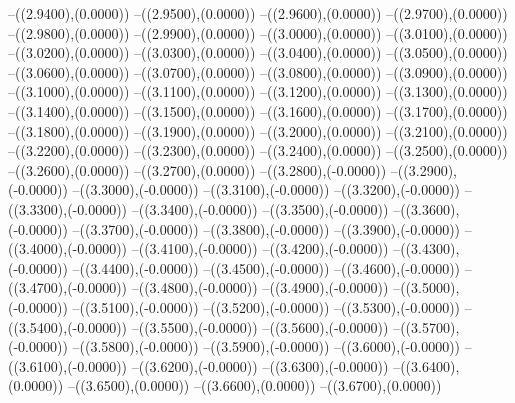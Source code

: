 {	--({\sx*(2.9400)},{\sy*(0.0000)})
	--({\sx*(2.9500)},{\sy*(0.0000)})
	--({\sx*(2.9600)},{\sy*(0.0000)})
	--({\sx*(2.9700)},{\sy*(0.0000)})
	--({\sx*(2.9800)},{\sy*(0.0000)})
	--({\sx*(2.9900)},{\sy*(0.0000)})
	--({\sx*(3.0000)},{\sy*(0.0000)})
	--({\sx*(3.0100)},{\sy*(0.0000)})
	--({\sx*(3.0200)},{\sy*(0.0000)})
	--({\sx*(3.0300)},{\sy*(0.0000)})
	--({\sx*(3.0400)},{\sy*(0.0000)})
	--({\sx*(3.0500)},{\sy*(0.0000)})
	--({\sx*(3.0600)},{\sy*(0.0000)})
	--({\sx*(3.0700)},{\sy*(0.0000)})
	--({\sx*(3.0800)},{\sy*(0.0000)})
	--({\sx*(3.0900)},{\sy*(0.0000)})
	--({\sx*(3.1000)},{\sy*(0.0000)})
	--({\sx*(3.1100)},{\sy*(0.0000)})
	--({\sx*(3.1200)},{\sy*(0.0000)})
	--({\sx*(3.1300)},{\sy*(0.0000)})
	--({\sx*(3.1400)},{\sy*(0.0000)})
	--({\sx*(3.1500)},{\sy*(0.0000)})
	--({\sx*(3.1600)},{\sy*(0.0000)})
	--({\sx*(3.1700)},{\sy*(0.0000)})
	--({\sx*(3.1800)},{\sy*(0.0000)})
	--({\sx*(3.1900)},{\sy*(0.0000)})
	--({\sx*(3.2000)},{\sy*(0.0000)})
	--({\sx*(3.2100)},{\sy*(0.0000)})
	--({\sx*(3.2200)},{\sy*(0.0000)})
	--({\sx*(3.2300)},{\sy*(0.0000)})
	--({\sx*(3.2400)},{\sy*(0.0000)})
	--({\sx*(3.2500)},{\sy*(0.0000)})
	--({\sx*(3.2600)},{\sy*(0.0000)})
	--({\sx*(3.2700)},{\sy*(0.0000)})
	--({\sx*(3.2800)},{\sy*(-0.0000)})
	--({\sx*(3.2900)},{\sy*(-0.0000)})
	--({\sx*(3.3000)},{\sy*(-0.0000)})
	--({\sx*(3.3100)},{\sy*(-0.0000)})
	--({\sx*(3.3200)},{\sy*(-0.0000)})
	--({\sx*(3.3300)},{\sy*(-0.0000)})
	--({\sx*(3.3400)},{\sy*(-0.0000)})
	--({\sx*(3.3500)},{\sy*(-0.0000)})
	--({\sx*(3.3600)},{\sy*(-0.0000)})
	--({\sx*(3.3700)},{\sy*(-0.0000)})
	--({\sx*(3.3800)},{\sy*(-0.0000)})
	--({\sx*(3.3900)},{\sy*(-0.0000)})
	--({\sx*(3.4000)},{\sy*(-0.0000)})
	--({\sx*(3.4100)},{\sy*(-0.0000)})
	--({\sx*(3.4200)},{\sy*(-0.0000)})
	--({\sx*(3.4300)},{\sy*(-0.0000)})
	--({\sx*(3.4400)},{\sy*(-0.0000)})
	--({\sx*(3.4500)},{\sy*(-0.0000)})
	--({\sx*(3.4600)},{\sy*(-0.0000)})
	--({\sx*(3.4700)},{\sy*(-0.0000)})
	--({\sx*(3.4800)},{\sy*(-0.0000)})
	--({\sx*(3.4900)},{\sy*(-0.0000)})
	--({\sx*(3.5000)},{\sy*(-0.0000)})
	--({\sx*(3.5100)},{\sy*(-0.0000)})
	--({\sx*(3.5200)},{\sy*(-0.0000)})
	--({\sx*(3.5300)},{\sy*(-0.0000)})
	--({\sx*(3.5400)},{\sy*(-0.0000)})
	--({\sx*(3.5500)},{\sy*(-0.0000)})
	--({\sx*(3.5600)},{\sy*(-0.0000)})
	--({\sx*(3.5700)},{\sy*(-0.0000)})
	--({\sx*(3.5800)},{\sy*(-0.0000)})
	--({\sx*(3.5900)},{\sy*(-0.0000)})
	--({\sx*(3.6000)},{\sy*(-0.0000)})
	--({\sx*(3.6100)},{\sy*(-0.0000)})
	--({\sx*(3.6200)},{\sy*(-0.0000)})
	--({\sx*(3.6300)},{\sy*(-0.0000)})
	--({\sx*(3.6400)},{\sy*(0.0000)})
	--({\sx*(3.6500)},{\sy*(0.0000)})
	--({\sx*(3.6600)},{\sy*(0.0000)})
	--({\sx*(3.6700)},{\sy*(0.0000)})
}

